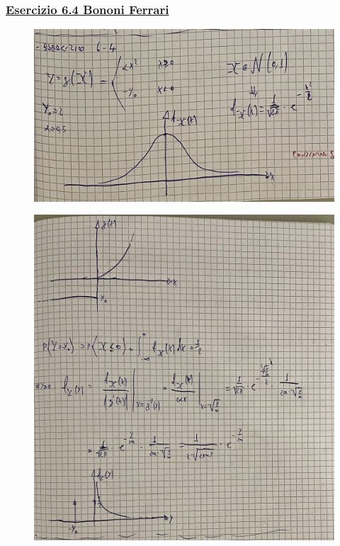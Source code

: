 \documentclass{article}
\begin{document}
\subsubsection{\underline{Esercizio 6.4 Bononi Ferrari}}
\begin{figure}[ht]
\centering
\includegraphics[scale=0.10]{ese/31.jpeg}
\end{figure}
\begin{figure}[ht]
\centering
\includegraphics[scale=0.10]{ese/31a.jpeg}
\end{figure}
\end{document}
